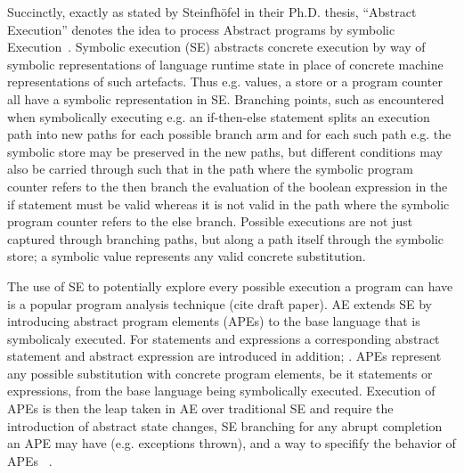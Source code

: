 
Succinctly, exactly as stated by Steinfhöfel in their Ph.D. thesis, “Abstract Execution” denotes the idea to process Abstract programs by symbolic Execution~\cite{steinhoefel-20}.
Symbolic execution (SE) \cite{DBLP:journals/csur/BaldoniCDDF18,DBLP:journals/ac/YangFBCW19} abstracts concrete execution by way of symbolic representations of language runtime
state in place of concrete machine representations of such artefacts.
Thus e.g. values, a store or a program counter all have a symbolic representation in SE.
Branching points, such as encountered when symbolically executing e.g. an if-then-else statement splits an execution path into new paths for each possible branch arm and for each such
path e.g. the symbolic store may be preserved in the new paths, but different conditions may also be carried through such that in the path where the symbolic program counter refers
to the then branch the evaluation of the boolean expression in the if statement must be valid whereas it is not valid in the path where the symbolic program counter refers to the else branch.
Possible executions are not just captured through branching paths, but along a path itself through the symbolic store; a symbolic value represents any valid concrete substitution.


The use of SE to potentially explore every possible execution a program can have is a popular program analysis technique (cite draft paper). AE extends SE by
introducing abstract program elements (APEs) to the base language that is symbolicaly executed.
For statements and expressions a corresponding abstract statement and abstract expression are introduced in addition; .
APEs represent any possible substitution with concrete program elements, be it statements or expressions, from the base language being symbolically executed.
Execution of APEs is then the leap taken in AE over traditional SE and require the introduction of abstract state changes, SE branching for
any abrupt completion an APE may have (e.g. exceptions thrown),  and a way to specifify the behavior of APEs ~\cite{steinhoefel-20}.

